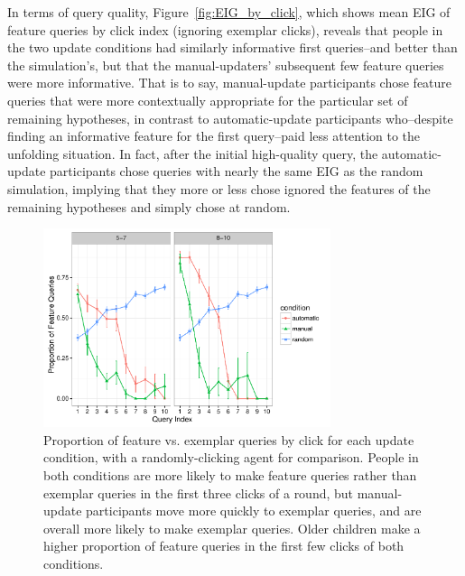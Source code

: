 \documentclass[man,floatsintext]{apa6}
\begin{document}
In terms of query quality, Figure~\ref{fig:EIG_by_click}, which shows mean EIG of feature queries by click index (ignoring exemplar clicks), reveals that people in the two update conditions had similarly informative first queries--and better than the simulation's, but that the manual-updaters' subsequent few feature queries were more informative. That is to say, manual-update participants chose feature queries that were more contextually appropriate for the particular set of remaining hypotheses, in contrast to automatic-update participants who--despite finding an informative feature for the first query--paid less attention to the unfolding situation. In fact, after the initial high-quality query, the automatic-update participants chose queries with nearly the same EIG as the random simulation, implying that they more or less chose ignored the features of the remaining hypotheses and simply chose at random.

\begin{figure}[!h]
  \centering
  \includegraphics[width=0.75\textwidth]{figures/proportion_feat_queries_by_click} %
  \vspace{-.1cm}
  \caption{Proportion of feature vs. exemplar queries by click for each update condition, with a randomly-clicking agent for comparison. People in both conditions are more likely to make feature queries rather than 
exemplar queries in the first three clicks of a round, but manual-update participants 
move more quickly to exemplar queries, and are overall more likely to make 
exemplar queries. Older children make a higher proportion of feature queries in the first few clicks of both conditions.}
  \label{fig:query-prop-click}
  \vspace{-.1cm}
\end{figure} 
\end{document}
